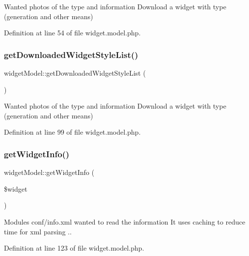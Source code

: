 Wanted photos of the type and information Download a widget with type (generation and other means) 



Definition at line 54 of file widget.\+model.\+php.

\hypertarget{classwidgetModel_a417d153dcef8dd22eddd204fa0fde16f}{}\label{classwidgetModel_a417d153dcef8dd22eddd204fa0fde16f} 
\subsubsection{\texorpdfstring{get\+Downloaded\+Widget\+Style\+List()}{getDownloadedWidgetStyleList()}}
{\footnotesize\ttfamily widget\+Model\+::get\+Downloaded\+Widget\+Style\+List (\begin{DoxyParamCaption}{ }\end{DoxyParamCaption})}



Wanted photos of the type and information Download a widget with type (generation and other means) 



Definition at line 99 of file widget.\+model.\+php.

\hypertarget{classwidgetModel_a6e29e4176b458525680606cb376cbff1}{}\label{classwidgetModel_a6e29e4176b458525680606cb376cbff1} 
\subsubsection{\texorpdfstring{get\+Widget\+Info()}{getWidgetInfo()}}
{\footnotesize\ttfamily widget\+Model\+::get\+Widget\+Info (\begin{DoxyParamCaption}\item[{}]{\$widget }\end{DoxyParamCaption})}



Modules conf/info.\+xml wanted to read the information It uses caching to reduce time for xml parsing .. 



Definition at line 123 of file widget.\+model.\+php.

\hypertarget{classwidgetModel_a4d8d9f9e650ece12a4cfa4338d1a9cc5}{}\label{classwidgetModel_a4d8d9f9e650ece12a4cfa4338d1a9cc5} 
